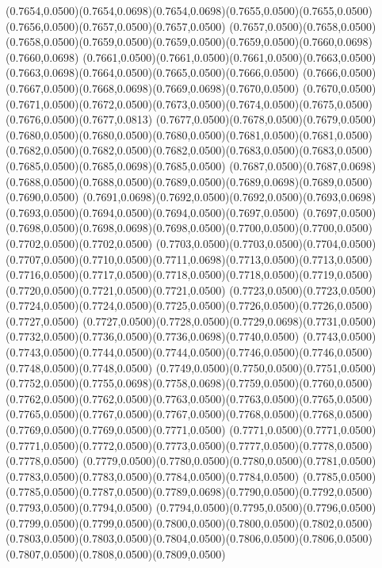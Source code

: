 (0.7654,0.0500)(0.7654,0.0698)(0.7654,0.0698)(0.7655,0.0500)(0.7655,0.0500)(0.7656,0.0500)(0.7657,0.0500)(0.7657,0.0500)
(0.7657,0.0500)(0.7658,0.0500)(0.7658,0.0500)(0.7659,0.0500)(0.7659,0.0500)(0.7659,0.0500)(0.7660,0.0698)(0.7660,0.0698)
(0.7661,0.0500)(0.7661,0.0500)(0.7661,0.0500)(0.7663,0.0500)(0.7663,0.0698)(0.7664,0.0500)(0.7665,0.0500)(0.7666,0.0500)
(0.7666,0.0500)(0.7667,0.0500)(0.7668,0.0698)(0.7669,0.0698)(0.7670,0.0500)
\PST@Solid(0.7670,0.0500)(0.7671,0.0500)(0.7672,0.0500)(0.7673,0.0500)(0.7674,0.0500)(0.7675,0.0500)(0.7676,0.0500)(0.7677,0.0813)
(0.7677,0.0500)(0.7678,0.0500)(0.7679,0.0500)(0.7680,0.0500)(0.7680,0.0500)(0.7680,0.0500)(0.7681,0.0500)(0.7681,0.0500)
(0.7682,0.0500)(0.7682,0.0500)(0.7682,0.0500)(0.7683,0.0500)(0.7683,0.0500)(0.7685,0.0500)(0.7685,0.0698)(0.7685,0.0500)
(0.7687,0.0500)(0.7687,0.0698)(0.7688,0.0500)(0.7688,0.0500)(0.7689,0.0500)(0.7689,0.0698)(0.7689,0.0500)(0.7690,0.0500)
(0.7691,0.0698)(0.7692,0.0500)(0.7692,0.0500)(0.7693,0.0698)(0.7693,0.0500)(0.7694,0.0500)(0.7694,0.0500)(0.7697,0.0500)
(0.7697,0.0500)(0.7698,0.0500)(0.7698,0.0698)(0.7698,0.0500)(0.7700,0.0500)(0.7700,0.0500)(0.7702,0.0500)(0.7702,0.0500)
(0.7703,0.0500)(0.7703,0.0500)(0.7704,0.0500)(0.7707,0.0500)(0.7710,0.0500)(0.7711,0.0698)(0.7713,0.0500)(0.7713,0.0500)
(0.7716,0.0500)(0.7717,0.0500)(0.7718,0.0500)(0.7718,0.0500)(0.7719,0.0500)(0.7720,0.0500)(0.7721,0.0500)(0.7721,0.0500)
(0.7723,0.0500)(0.7723,0.0500)(0.7724,0.0500)(0.7724,0.0500)(0.7725,0.0500)(0.7726,0.0500)(0.7726,0.0500)(0.7727,0.0500)
(0.7727,0.0500)(0.7728,0.0500)(0.7729,0.0698)(0.7731,0.0500)(0.7732,0.0500)(0.7736,0.0500)(0.7736,0.0698)(0.7740,0.0500)
(0.7743,0.0500)(0.7743,0.0500)(0.7744,0.0500)(0.7744,0.0500)(0.7746,0.0500)(0.7746,0.0500)(0.7748,0.0500)(0.7748,0.0500)
(0.7749,0.0500)(0.7750,0.0500)(0.7751,0.0500)(0.7752,0.0500)(0.7755,0.0698)(0.7758,0.0698)(0.7759,0.0500)(0.7760,0.0500)
(0.7762,0.0500)(0.7762,0.0500)(0.7763,0.0500)(0.7763,0.0500)(0.7765,0.0500)
\PST@Solid(0.7765,0.0500)(0.7767,0.0500)(0.7767,0.0500)(0.7768,0.0500)(0.7768,0.0500)(0.7769,0.0500)(0.7769,0.0500)(0.7771,0.0500)
(0.7771,0.0500)(0.7771,0.0500)(0.7771,0.0500)(0.7772,0.0500)(0.7773,0.0500)(0.7777,0.0500)(0.7778,0.0500)(0.7778,0.0500)
(0.7779,0.0500)(0.7780,0.0500)(0.7780,0.0500)(0.7781,0.0500)(0.7783,0.0500)(0.7783,0.0500)(0.7784,0.0500)(0.7784,0.0500)
(0.7785,0.0500)(0.7785,0.0500)(0.7787,0.0500)(0.7789,0.0698)(0.7790,0.0500)(0.7792,0.0500)(0.7793,0.0500)(0.7794,0.0500)
(0.7794,0.0500)(0.7795,0.0500)(0.7796,0.0500)(0.7799,0.0500)(0.7799,0.0500)(0.7800,0.0500)(0.7800,0.0500)(0.7802,0.0500)
(0.7803,0.0500)(0.7803,0.0500)(0.7804,0.0500)(0.7806,0.0500)(0.7806,0.0500)(0.7807,0.0500)(0.7808,0.0500)(0.7809,0.0500)
